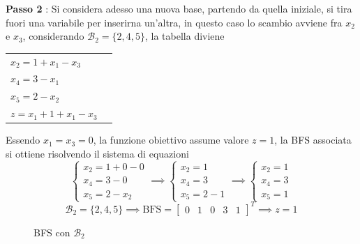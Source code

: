 \documentclass[10pt, letterpaper]{report}
\begin{document}
\textbf{Passo 2} : Si considera adesso una nuova base, partendo da quella iniziale, si tira fuori una variabile per inserirna un'altra, in questo caso lo scambio avviene fra $x_2$ e $x_3$, considerando $\mathcal B_2 = \{2,4,5\}$, la tabella diviene 
\begin{center}
    \begin{tabular}{|l|l|}\hline 
        $x_2=1+x_1-x_3$\\ 
        $x_4=3-x_1$\\ 
        $x_5=2-x_2$ \\
        \hline 
        $z=x_1+1+x_1-x_3$ \\\hline 
    \end{tabular}
\end{center}
Essendo $x_1=x_3=0$, la funzione obiettivo assume valore $z=1$, la BFS associata si ottiene risolvendo il sistema di equazioni
$$\begin{cases}
    x_2=1+0-0\\ 
    x_4=3-0\\ 
    x_5=2-x_2
\end{cases}\implies\begin{cases}
    x_2=1\\ 
    x_4=3\\ 
    x_5=2-1
\end{cases}\implies\begin{cases}
    x_2=1\\ x_4=3\\ x_5=1
\end{cases}$$
$$ \mathcal{B}_2 = \{2,4,5\}\implies \text{BFS}=\begin{bmatrix}
    0 & 1 & 0 & 3 & 1 
\end{bmatrix}^T \implies z = 1$$
\begin{figure}[h]
    \caption{BFS con $\mathcal B_2$}
\end{figure}
\end{document}
